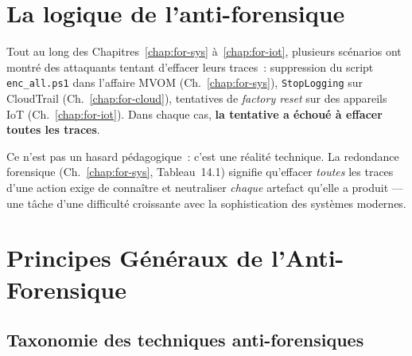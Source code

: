 \bigskip

\section*{La logique de l'anti-forensique}

Tout au long des Chapitres~\ref{chap:for-sys} à~\ref{chap:for-iot},
plusieurs scénarios ont montré des attaquants tentant d'effacer leurs
traces~: suppression du script \texttt{enc\_all.ps1} dans l'affaire MVOM
(Ch.~\ref{chap:for-sys}), \texttt{StopLogging} sur CloudTrail
(Ch.~\ref{chap:for-cloud}), tentatives de \textit{factory reset}
sur des appareils IoT (Ch.~\ref{chap:for-iot}). Dans chaque cas,
\textbf{la tentative a échoué à effacer toutes les traces}.

Ce n'est pas un hasard pédagogique~: c'est une réalité technique.
La redondance forensique (Ch.~\ref{chap:for-sys}, Tableau~14.1)
signifie qu'effacer \emph{toutes} les traces d'une action exige
de connaître et neutraliser \emph{chaque} artefact qu'elle a produit
--- une tâche d'une difficulté croissante avec la sophistication
des systèmes modernes.

\separateur

\section{Principes Généraux de l'Anti-Forensique}
\label{sec:principes-anti-for}

\subsection{Taxonomie des techniques anti-forensiques}

